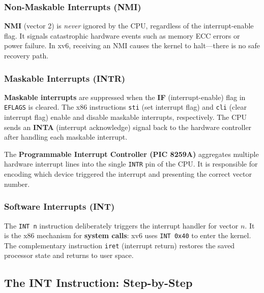 \documentclass[11pt]{article}
\begin{document}
\subsubsection*{Non-Maskable Interrupts (NMI)}

\textbf{NMI} (vector 2) is \emph{never} ignored by the CPU, regardless of the interrupt-enable flag. It signals catastrophic hardware events such as memory ECC errors or power failure. In xv6, receiving an NMI causes the kernel to halt---there is no safe recovery path.

\subsubsection*{Maskable Interrupts (INTR)}

\textbf{Maskable interrupts} are suppressed when the \textbf{IF} (interrupt-enable) flag in \texttt{EFLAGS} is cleared. The x86 instructions \texttt{sti} (set interrupt flag) and \texttt{cli} (clear interrupt flag) enable and disable maskable interrupts, respectively. The CPU sends an \textbf{INTA} (interrupt acknowledge) signal back to the hardware controller after handling each maskable interrupt.

The \textbf{Programmable Interrupt Controller (PIC 8259A)} aggregates multiple hardware interrupt lines into the single \texttt{INTR} pin of the CPU. It is responsible for encoding which device triggered the interrupt and presenting the correct vector number.

\subsubsection*{Software Interrupts (INT)}

The \texttt{INT n} instruction deliberately triggers the interrupt handler for vector $n$. It is the x86 mechanism for \textbf{system calls}: xv6 uses \texttt{INT 0x40} to enter the kernel. The complementary instruction \texttt{iret} (interrupt return) restores the saved processor state and returns to user space.

\subsection{The INT Instruction: Step-by-Step}
\end{document}
